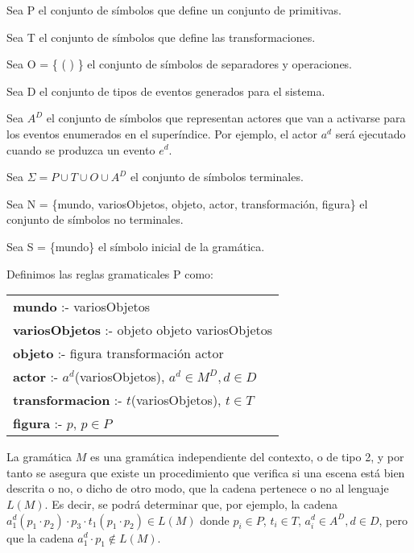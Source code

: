 \documentclass{egpubl}
\begin{document}
\begin{itshape}
	Sea P el conjunto de s\'imbolos que define un conjunto de primitivas.
	
	Sea T el conjunto de s\'imbolos que define las transformaciones.
	
	Sea O = \{ {\textperiodcentered} ( ) \} el conjunto de s\'imbolos de
	separadores y operaciones.
	
	Sea D el conjunto de tipos de eventos generados para el sistema.
	
	Sea $A^{D}$ el conjunto de s\'imbolos que representan
	actores que van a activarse para los eventos enumerados en el
	super\'indice. Por ejemplo, el actor $a^{d}$ ser\'a
	ejecutado cuando se produzca un evento $e^{d}$.
	
	Sea $\Sigma = P \cup T \cup O \cup A^{D}$ el
	conjunto de s\'imbolos terminales.
	
	Sea N = \{mundo, variosObjetos, objeto, actor, transformaci\'on,
	figura\} el conjunto de s\'imbolos no terminales.

	Sea S = \{mundo\} el s\'imbolo inicial de la gram\'atica.
\end{itshape}



Definimos las reglas gramaticales P como:


\begin{center}

\begin{tabular}{|l|}
	\hline

	\textbf{mundo} :- variosObjetos \\
	
	\textbf{variosObjetos} :- objeto {\textbar} objeto {\textperiodcentered} variosObjetos\\
	
	\textbf{objeto} :- figura {\textbar} transformaci\'on {\textbar} actor\\
	
	\textbf{actor} :- $a^{d}$(variosObjetos), $a^{d} \in M^{D}, d \in D$\\
	
	\textbf{transformacion} :- $t$(variosObjetos), $t \in T$\\
	
	\textbf{figura} :- $p$, $p \in P$\\

	\hline
\end{tabular}
\end{center}


La gram\'atica $M$ es una gram\'atica independiente del contexto,
o de tipo 2, y por tanto se asegura que existe un
procedimiento que verifica si una escena est\'a bien descrita o no, o
dicho de otro modo, que la cadena pertenece o no al lenguaje $L(M)$. Es
decir, se podr\'a determinar que, por ejemplo, la cadena
$a_{1}^{d} ( p_{1} \cdotp p_{2} ) \cdotp p_{3} \cdotp t_{1} ( p_{1} \cdotp p_{2}) \in L(M)$ 
donde
$p_{i} \in P$, 
$t_{i} \in T$, 
$a_{i}^{d} \in A^{D}, d \in D$,
pero que la cadena
$a_{1}^{d} \cdotp p_{1} \notin L(M)$.
\end{document}
